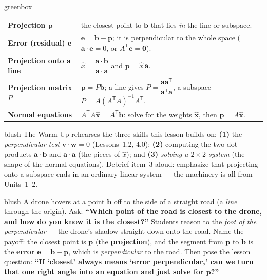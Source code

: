 \documentclass[10pt]{article}
\newcommand{\vv}{\mathbf{v}}
\newcommand{\ww}{\mathbf{w}}
\newcommand{\xx}{\mathbf{x}}
\newcommand{\bb}{\mathbf{b}}
\newcommand{\pp}{\mathbf{p}}
\newcommand{\ee}{\mathbf{e}}
\newcommand{\avec}{\mathbf{a}}
\newcommand{\zero}{\mathbf{0}}
\newcommand{\T}{\mathsf{T}}
\begin{document}
\begin{skillbox}{greenbox}
\renewcommand{\arraystretch}{1.3}
\begin{tabularx}{\linewidth}{@{}l X@{}}
\textbf{Projection $\pp$} & the closest point to $\bb$ that lies \emph{in} the line or subspace. \\
\textbf{Error (residual) $\ee$} & $\ee=\bb-\pp$; it is perpendicular to the whole space ($\avec\cdot\ee=0$, or $A^{\T}\ee=\zero$). \\
\textbf{Projection onto a line} & $\hat{x}=\dfrac{\avec\cdot\bb}{\avec\cdot\avec}$ and $\pp=\hat{x}\,\avec$. \\
\textbf{Projection matrix $P$} & $\pp=P\bb$; a line gives $P=\dfrac{\avec\avec^{\T}}{\avec^{\T}\avec}$, a subspace $P=A(A^{\T}A)^{-1}A^{\T}$. \\
\textbf{Normal equations} & $A^{\T}A\hat{\xx}=A^{\T}\bb$: solve for the weights $\hat{\xx}$, then $\pp=A\hat{\xx}$. \\
\end{tabularx}
\end{skillbox}

\begin{fixedskillbox}{blush}
    The Warm-Up rehearses the three skills this lesson builds on:
    \textbf{(1)} the \emph{perpendicular test} $\vv\cdot\ww=0$ (Lessons~1.2, 4.0);
    \textbf{(2)} computing the two dot products $\avec\cdot\bb$ and $\avec\cdot\avec$ (the pieces of
    $\hat{x}$); and \textbf{(3)} \emph{solving a $2\times2$ system} (the shape of the normal equations).
    Debrief item~3 aloud: emphasize that projecting onto a subspace ends in an ordinary linear system ---
    the machinery is all from Units~1--2.
\end{fixedskillbox}

\begin{skillbox}[Hook]{blush}
    A drone hovers at a point $\bb$ off to the side of a straight road (a \emph{line} through the
    origin). Ask: \textbf{``Which point of the road is closest to the drone, and how do you know it is
    the closest?''} Students reason to the \emph{foot of the perpendicular} --- the drone's shadow
    straight down onto the road. Name the payoff: the closest point is $\pp$ (the \textbf{projection}),
    and the segment from $\pp$ to $\bb$ is the \textbf{error} $\ee=\bb-\pp$, which is \emph{perpendicular}
    to the road. Then pose the lesson question: \textbf{``If `closest' always means `error perpendicular,'
    can we turn that one right angle into an equation and just solve for $\pp$?''}
\end{skillbox}
\end{document}
